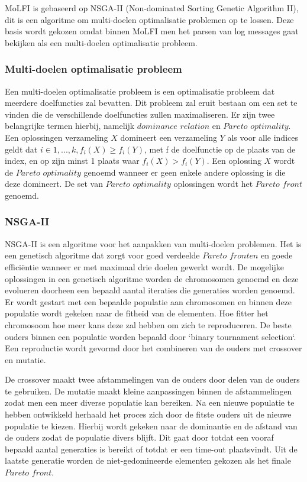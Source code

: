MoLFI is gebaseerd op NSGA-II (Non-dominated Sorting Genetic Algorithm II), dit is een algoritme om multi-doelen optimalisatie problemen op te lossen. Deze basis wordt gekozen omdat binnen MoLFI men het parsen van log messages gaat bekijken als een multi-doelen optimalisatie probleem. 

\subsubsection{Multi-doelen optimalisatie probleem}
Een multi-doelen optimalisatie probleem is een optimalisatie probleem dat meerdere doelfuncties zal bevatten. Dit probleem zal eruit bestaan om een set te vinden die de verschillende doelfuncties zullen maximaliseren. Er zijn twee belangrijke termen hierbij, namelijk $dominance$ $relation$ en $Pareto$ $optimality$. Een oplossingen verzameling $X$ domineert een verzameling $Y$ als voor alle indices geldt dat \(i \in {1,...,k}, f_{i}(X) \geq f_{i}(Y)\), met f de doelfunctie op de plaats van de index, en op zijn minst 1 plaats waar \(f_{i}(X) > f_{i}(Y)\). Een oplossing $X$ wordt de $Pareto$ $optimality$ genoemd wanneer er geen enkele andere oplossing is die deze domineert. De set van $Pareto$ $optimality$ oplossingen wordt het $Pareto$ $front$ genoemd.

\subsubsection{NSGA-II}
NSGA-II is een algoritme voor het aanpakken van multi-doelen problemen. Het is een genetisch algoritme dat zorgt voor goed verdeelde $Pareto$ $fronten$ en goede efficiëntie wanneer er met maximaal drie doelen gewerkt wordt. De mogelijke oplossingen in een genetisch algoritme worden de chromosomen genoemd en deze evolueren doorheen een bepaald aantal iteraties die generaties worden genoemd. Er wordt gestart met een bepaalde populatie aan chromosomen en binnen deze populatie wordt gekeken naar de fitheid van de elementen. Hoe fitter het chromosoom hoe meer kans deze zal hebben om zich te reproduceren. De beste ouders binnen een populatie worden bepaald door `binary tournament selection`. Een reproductie wordt gevormd door het combineren van de ouders met crossover en mutatie. 

De crossover maakt twee afstammelingen van de ouders door delen van de ouders te gebruiken. De mutatie maakt kleine aanpassingen binnen de afstammelingen zodat men een meer diverse populatie kan bereiken. Na een nieuwe populatie te hebben ontwikkeld herhaald het proces zich door de fitste ouders uit de nieuwe populatie te kiezen. Hierbij wordt gekeken naar de dominantie en de afstand van de ouders zodat de populatie divers blijft. Dit gaat door totdat een vooraf bepaald aantal generaties is bereikt of totdat er een time-out plaatsvindt. Uit de laatste generatie worden de niet-gedomineerde elementen gekozen als het finale $Pareto$ $front$.

